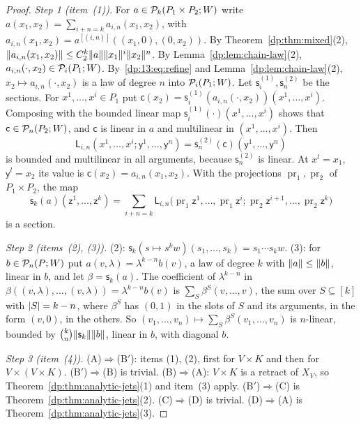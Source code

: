 \begin{proof}
\emph{Step 1 (item~(1)).} For $a\in\mathcal P_k(P_1\times P_2;W)$ write $a(x_1,x_2)=\sum_{i+n=k}a_{i,n}(x_1,x_2)$, with $a_{i,n}(x_1,x_2)=a^{[(i,n)]}((x_1,0),(0,x_2))$. By Theorem~\ref{dp:thm:mixed}(2), $\lVert a_{i,n}(x_1,x_2)\rVert\le C_2^k\lVert a\rVert\lVert x_1\rVert^i\lVert x_2\rVert^n$. By Lemma~\ref{dp:lem:chain-law}(2), $a_{i,n}({\cdot},x_2)\in\mathcal P_i(P_1;W)$. By~\eqref{dp:13:eq:refine} and Lemma~\ref{dp:lem:chain-law}(2), $x_2\mapsto a_{i,n}({\cdot},x_2)$ is a law of degree $n$ into $\mathcal P_i(P_1;W)$. Let $\mathsf s^{(1)}_i,\mathsf s^{(2)}_n$ be the sections. For $x^1,\dots,x^i\in P_1$ put $\mathsf c(x_2)=\mathsf s^{(1)}_i(a_{i,n}({\cdot},x_2))(x^1,\dots,x^i)$. Composing with the bounded linear map $\mathsf s^{(1)}_i({\cdot})(x^1,\dots,x^i)$ shows that $\mathsf c\in\mathcal P_n(P_2;W)$, and $\mathsf c$ is linear in $a$ and multilinear in $(x^1,\dots,x^i)$. Then
\[
 \mathsf L_{i,n}(x^1,\dots,x^i;\mathsf y^1,\dots,\mathsf y^n)=\mathsf s^{(2)}_n(\mathsf c)(\mathsf y^1,\dots,\mathsf y^n)
\]
is bounded and multilinear in all arguments, because $\mathsf s^{(2)}_n$ is linear. At $x^l=x_1$, $\mathsf y^l=x_2$ its value is $\mathsf c(x_2)=a_{i,n}(x_1,x_2)$. With the projections $\operatorname{pr}_1,\operatorname{pr}_2$ of $P_1\times P_2$, the map
\[
 \mathsf s_k(a)(\mathsf z^1,\dots,\mathsf z^k)=\sum_{i+n=k}\mathsf L_{i,n}\bigl(\operatorname{pr}_1\mathsf z^1,\dots,\operatorname{pr}_1\mathsf z^i;\operatorname{pr}_2\mathsf z^{i+1},\dots,\operatorname{pr}_2\mathsf z^k\bigr)
\]
is a section.

\emph{Step 2 (items~(2), (3)).} (2): $\mathsf s_k(s\mapsto s^kw)(s_1,\dots,s_k)=s_1\cdots s_kw$. (3): for $b\in\mathcal P_n(P;W)$ put $a(v,\lambda)=\lambda^{k-n}b(v)$, a law of degree $k$ with $\lVert a\rVert\le\lVert b\rVert$, linear in $b$, and let $\beta=\mathsf s_k(a)$. The coefficient of $\lambda^{k-n}$ in $\beta((v,\lambda),\dots,(v,\lambda))=\lambda^{k-n}b(v)$ is $\sum_S\beta^S(v,\dots,v)$, the sum over $S\subseteq[k]$ with $\lvert S\rvert=k-n$, where $\beta^S$ has $(0,1)$ in the slots of $S$ and its arguments, in the form $(v,0)$, in the others. So $(v_1,\dots,v_n)\mapsto\sum_S\beta^S(v_1,\dots,v_n)$ is $n$-linear, bounded by $\binom kn\lVert \mathsf s_k\rVert\lVert b\rVert$, linear in $b$, with diagonal $b$.

\emph{Step 3 (item~(4)).} (A)$\Rightarrow$(B$'$): items (1), (2), first for $V\times K$ and then for $V\times(V\times K)$. (B$'$)$\Rightarrow$(B) is trivial. (B)$\Rightarrow$(A): $V\times K$ is a retract of $X_V$, so Theorem~\ref{dp:thm:analytic-jets}(1) and item~(3) apply. (B$'$)$\Rightarrow$(C) is Theorem~\ref{dp:thm:analytic-jets}(2). (C)$\Rightarrow$(D) is trivial. (D)$\Rightarrow$(A) is Theorem~\ref{dp:thm:analytic-jets}(3).
\end{proof}

